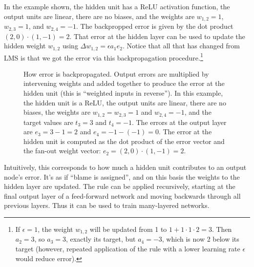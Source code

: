  In the example shown, the hidden unit has a ReLU activation function, the output units are linear, there are no biases, and the weights are $w_{1,2} = 1$, $w_{2,3} = 1$, and $w_{2,4} = -1$. The backpropped error is given by the dot product $(2, 0) \cdot (1, -1) = 2$. That error at the hidden layer can be used to update the hidden weight $w_{1,2}$ using  $\Delta w_{1,2}  =  \epsilon a_1 e_2$. Notice that all that has changed from LMS is that we got the error via this backpropagation procedure.\footnote{If $\epsilon = 1$, the weight  $w_{1,2}$ will be updated from 1 to $1 + 1 \cdot 1 \cdot 2 = 3$. Then $a_2 = 3$, so $a_3 = 3$, exactly its target, but $a_4 = -3$, which is now 2 below its target (however, repeated application of the rule with a lower learning rate $\epsilon$  would reduce error).}
\begin{figure}[h]
\centering
{}
\caption[Jeff Yoshimi.]{How error is backpropagated. Output errors are multiplied by intervening weights and added together to produce the error at the hidden unit (this is ``weighted inputs in reverse''). In this example, the hidden unit is a ReLU, the output units are linear, there are no biases, the weights are $w_{1,2} = w_{2,3} = 1$ and $w_{2,4} = -1$, and the target values are $t_3 = 3$ and $t_4 = -1$. The errors at the output layer are $e_3 = 3-1=2$ and $e_4 = -1 - (-1) =  0$.  The error at the hidden unit is computed as the dot product of the error vector and the fan-out weight vector: $e_2 = (2, 0) \cdot (1, -1) = 2$.}
\label{backprop_error}
\end{figure}

Intuitively, this corresponds to how much a  hidden unit contributes to an output node's error. It's as if ``blame is assigned'', and on this basis the weights to the hidden layer are updated. The rule can be applied recursively, starting at the final output layer of a feed-forward network and moving backwards through all previous layers. Thus it can be used to train many-layered networks.

